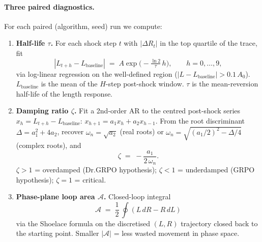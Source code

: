 \paragraph{Three paired diagnostics.}
For each paired (algorithm, seed) run we compute:
\begin{enumerate}
\item \textbf{Half-life $\tau$.} For each shock step $t$ with
      $|\Delta R_t|$ in the top quartile of the trace, fit
      \begin{equation}\label{eq:lb76-tau}
      |L_{t+h} - L_{\mathrm{baseline}}| \;=\; A \exp\!\bigl(-\tfrac{\ln 2}{\tau}\,h\bigr),
      \qquad h = 0, \ldots, 9,
      \end{equation}
      via log-linear regression on the well-defined region
      ($|L - L_{\mathrm{baseline}}| > 0.1\,A_0$). $L_{\mathrm{baseline}}$
      is the mean of the $H$-step post-shock window. $\tau$ is the
      mean-reversion half-life of the length response.
\item \textbf{Damping ratio $\zeta$.} Fit a 2nd-order AR to the
      centred post-shock series $x_h = L_{t+h} - L_{\mathrm{baseline}}$:
      $x_{h+1} = a_1 x_h + a_2 x_{h-1}$. From the root discriminant
      $\Delta = a_1^2 + 4 a_2$, recover
      $\omega_n = \sqrt{a_2}$ (real roots) or
      $\omega_n = \sqrt{(a_1/2)^2 - \Delta/4}$ (complex roots), and
      \begin{equation}\label{eq:lb76-zeta}
      \zeta \;=\; -\frac{a_1}{2\,\omega_n}.
      \end{equation}
      $\zeta > 1$ = overdamped (Dr.GRPO hypothesis);
      $\zeta < 1$ = underdamped (GRPO hypothesis);
      $\zeta = 1$ = critical.
\item \textbf{Phase-plane loop area $\mathcal{A}$.} Closed-loop integral
      \begin{equation}\label{eq:lb76-loop}
      \mathcal{A} \;=\; \frac{1}{2}\,\oint (L\,dR - R\,dL)
      \end{equation}
      via the Shoelace formula on the discretised $(L, R)$
      trajectory closed back to the starting point. Smaller
      $|\mathcal{A}|$ = less wasted movement in phase space.
\end{enumerate}

